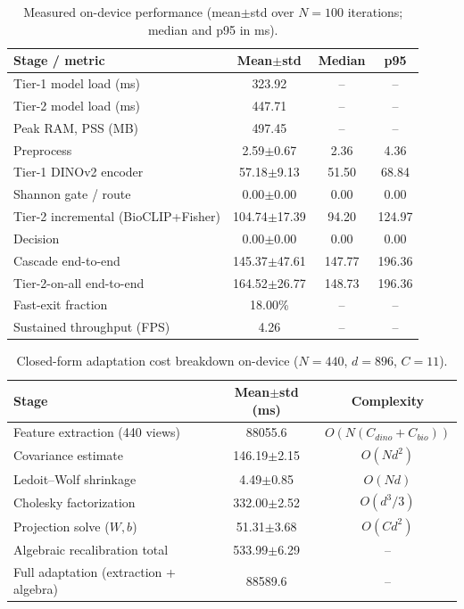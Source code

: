 \documentclass[preprint,12pt]{elsarticle}
\begin{document}
\begin{table}[htbp]
\centering
\caption{Measured on-device performance (mean$\pm$std over $N=100$ iterations; median and p95 in ms).}
\label{tab:device_perf}
\footnotesize
\begin{tabular}{lccc}
\toprule
Stage / metric & Mean$\pm$std & Median & p95 \\
\midrule
Tier-1 model load (ms) & 323.92 & -- & -- \\
Tier-2 model load (ms) & 447.71 & -- & -- \\
Peak RAM, PSS (MB) & 497.45 & -- & -- \\
\midrule
Preprocess & 2.59$\pm$0.67 & 2.36 & 4.36 \\
Tier-1 DINOv2 encoder & 57.18$\pm$9.13 & 51.50 & 68.84 \\
Shannon gate / route & 0.00$\pm$0.00 & 0.00 & 0.00 \\
Tier-2 incremental (BioCLIP+Fisher) & 104.74$\pm$17.39 & 94.20 & 124.97 \\
Decision & 0.00$\pm$0.00 & 0.00 & 0.00 \\
Cascade end-to-end & 145.37$\pm$47.61 & 147.77 & 196.36 \\
Tier-2-on-all end-to-end & 164.52$\pm$26.77 & 148.73 & 196.36 \\
\midrule
Fast-exit fraction & 18.00\% & -- & -- \\
Sustained throughput (FPS) & 4.26 & -- & -- \\
\bottomrule
\end{tabular}
\end{table}

\begin{table}[htbp]
\centering
\caption{Closed-form adaptation cost breakdown on-device ($N=440$, $d=896$, $C=11$).}
\label{tab:adaptation_breakdown}
\footnotesize
\begin{tabular}{lcc}
\toprule
Stage & Mean$\pm$std (ms) & Complexity \\
\midrule
Feature extraction (440 views) & 88055.6 & $O(N(C_{dino}+C_{bio}))$ \\
Covariance estimate & 146.19$\pm$2.15 & $O(Nd^2)$ \\
Ledoit--Wolf shrinkage & 4.49$\pm$0.85 & $O(Nd)$ \\
Cholesky factorization & 332.00$\pm$2.52 & $O(d^3/3)$ \\
Projection solve ($W,b$) & 51.31$\pm$3.68 & $O(Cd^2)$ \\
\midrule
Algebraic recalibration total & 533.99$\pm$6.29 & -- \\
Full adaptation (extraction + algebra) & 88589.6 & -- \\
\bottomrule
\end{tabular}
\end{table}
\end{document}
